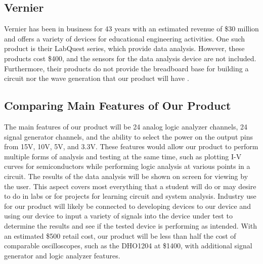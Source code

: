 \subsection{Vernier}
Vernier has been in business for 43 years with an estimated revenue of \$30 million and offers a variety of devices for educational engineering activities. One such product is their LabQuest series, which provide data analysis. However, these products cost \$400, and the sensors for the data analysis device are not included. Furthermore, their products do not provide the breadboard base for building a circuit nor the wave generation that our product will have \cite{vernier2023}.

\subsection{Comparing Main Features of Our Product}
The main features of our product will be 24 analog logic analyzer channels, 24 signal generator channels, and the ability to select the power on the output pins from 15V, 10V, 5V, and 3.3V. These features would allow our product to perform multiple forms of analysis and testing at the same time, such as plotting I-V curves for semiconductors while performing logic analysis at various points in a circuit. The results of the data analysis will be shown on screen for viewing by the user. This aspect covers most everything that a student will do or may desire to do in labs or for projects for learning circuit and system analysis. Industry use for our product will likely be connected to developing devices to our device and using our device to input a variety of signals into the device under test to determine the results and see if the tested device is performing as intended. With an estimated \$500 retail cost, our product will be less than half the cost of comparable oscilloscopes, such as the DHO1204 at \$1400, with additional signal generator and logic analyzer features.
